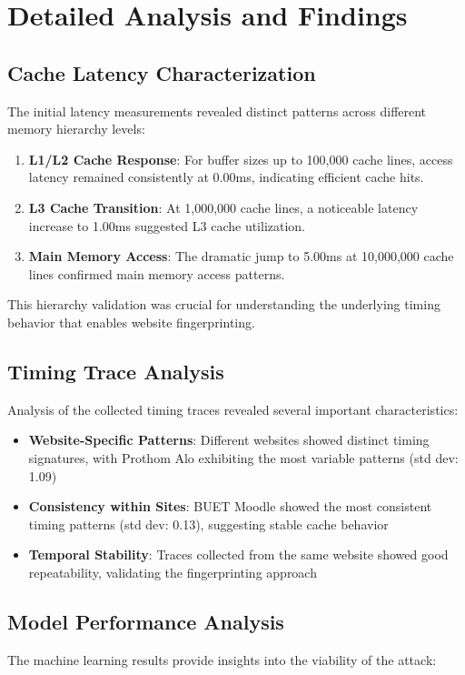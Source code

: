 \documentclass[11pt,a4paper]{article}
\begin{document}
\section{Detailed Analysis and Findings}

\subsection{Cache Latency Characterization}
The initial latency measurements revealed distinct patterns across different memory hierarchy levels:

\begin{enumerate}
    \item \textbf{L1/L2 Cache Response}: For buffer sizes up to 100,000 cache lines, access latency remained consistently at 0.00ms, indicating efficient cache hits.
    \item \textbf{L3 Cache Transition}: At 1,000,000 cache lines, a noticeable latency increase to 1.00ms suggested L3 cache utilization.
    \item \textbf{Main Memory Access}: The dramatic jump to 5.00ms at 10,000,000 cache lines confirmed main memory access patterns.
\end{enumerate}

This hierarchy validation was crucial for understanding the underlying timing behavior that enables website fingerprinting.

\subsection{Timing Trace Analysis}
Analysis of the collected timing traces revealed several important characteristics:

\begin{itemize}
    \item \textbf{Website-Specific Patterns}: Different websites showed distinct timing signatures, with Prothom Alo exhibiting the most variable patterns (std dev: 1.09)
    \item \textbf{Consistency within Sites}: BUET Moodle showed the most consistent timing patterns (std dev: 0.13), suggesting stable cache behavior
    \item \textbf{Temporal Stability}: Traces collected from the same website showed good repeatability, validating the fingerprinting approach
\end{itemize}

\subsection{Model Performance Analysis}
The machine learning results provide insights into the viability of the attack:
\end{document}
